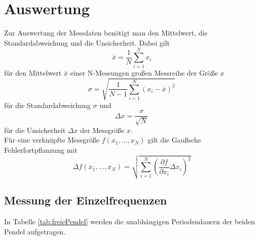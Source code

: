 \section{Auswertung}
\label{sec:Auswertung}
Zur Auswertung der Messdaten benötigt man den Mittelwert, die Standardabweichung und die Unsicherheit. Dabei gilt
\begin{equation}
  \bar{x}=\dfrac{1}{N}\sum_{i=1}^N x_i
  \label{eq:mean}
\end{equation}
für den Mittelwert $\bar{x}$ einer N-Messungen großen Messreihe der Größe $x$
\begin{equation}
σ=\sqrt{\dfrac{1}{N-1}\sum_{i=1}^N(x_i-\bar{x})^2} 
\label{eq:std} 
\end{equation}
für die Standardabweichung $σ$ und
\begin{equation}
  Δx=\dfrac{σ}{\sqrt{N}}
  \label{eq:unc} 
\end{equation}
für die Unsicherheit $Δx$ der Messgröße $x$. \\

Für eine verknüpfte Messgröße $f(x_1,...,x_N)$ gilt die Gaußsche Fehlerfortpflanzung mit
\begin{equation}
Δf(x_1,...,x_N)=\sqrt{\sum_{i=1}^N (\frac{\partial f}{\partial x_i}Δx_i)^2}
\label{eq:gaussF}
\end{equation}

\newpage

\subsection{Messung der Einzelfrequenzen}
In Tabelle \ref{tab:freiePendel}  werden die unabhängigen Periodendauern der beiden Pendel aufgetragen.

